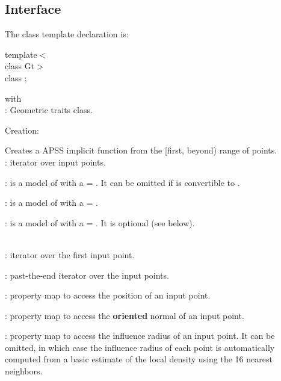 \subsection{Interface}

The class template declaration is:

template$<$  \\
class Gt$>$   \\
class ;

with  \\
: Geometric traits class.


Creation:


{
Creates a APSS implicit function from the [first, beyond) range of points.
  \\
: iterator over input points.

: is a model of  with a  = . It can be omitted if   is convertible to .

: is a model of  with a  = .

: is a model of  with a  = . It is optional (see below).

  \\
: iterator over the first input point.

: past-the-end iterator over the input points.

: property map to access the position of an input point.

: property map to access the {\bf oriented} normal of an input point.

: property map to access the influence radius of an input point. It can be omitted, in which case the influence radius of each point is automatically computed from a basic estimate of the local density using the 16 nearest neighbors.
}


